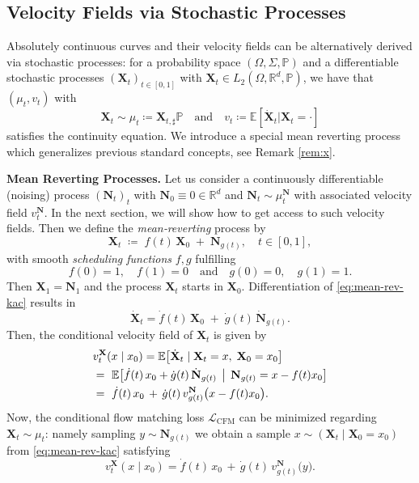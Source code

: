 \documentclass{article}
\newcommand{\R}{\mathbb{R}}
\theoremstyle{plain}
\theoremstyle{definition}
\theoremstyle{remark}
\begin{document}
{\subsection{Velocity Fields via Stochastic Processes}\label{sec:cooking}}
Absolutely continuous curves and their velocity fields can be alternatively derived via stochastic processes:
for a probability space $(\Omega, \Sigma, \mathbb P)$ and a differentiable stochastic processes $(\mathbf X_t)_{t \in [0,1]}$ with $\mathbf X_t \in L_2(\Omega,\mathbb R^d, \mathbb P)$, we have that $(\mu_t,v_t)$ with
\begin{equation}\label{eq:Ce_process}
\mathbf X_t \sim \mu_t \coloneqq \mathbf X_{t,\sharp} \mathbb P 
\quad \text{and} \quad v_t \coloneqq \mathbb E [ \mathbf{\dot X}_t| \mathbf X_t = \cdot]
\end{equation}
satisfies the continuity equation.
We introduce a special mean reverting process which generalizes previous standard concepts, see Remark \ref{rem:x}.

\textbf{Mean Reverting Processes.} 
Let us consider a continuously differentiable (noising) process $(\mathbf{N}_t)_t$ with $\mathbf{N}_0 \equiv 0 \in \R^d$ and $\mathbf{N}_t \sim \mu^{\mathbf{N}}_t$
with associated velocity field $v^{\mathbf{N}}_t$.
In the next section, we will show how to get access to such velocity fields.
Then we define the \emph{mean‐reverting} process by
\begin{equation}\label{eq:mean-rev-kac}
  \mathbf{X}_t \;\coloneqq\; f(t)\,\mathbf{X}_0 \;+\; \mathbf{N}_{g(t)},
  \quad t\in[0,1],
\end{equation}
with smooth \emph{scheduling functions} \(f,g\) fulfilling
\begin{equation}\label{schedules}
  f(0)=1,\quad f(1)=0 \quad \text{and} \quad g(0)=0,\quad g(1) = 1.  
\end{equation}
Then \(\mathbf{X}_1=\mathbf{N}_{1}\) and  the process $\mathbf{X}_t$ starts in \(\mathbf{X}_0\).  Differentiation of \eqref{eq:mean-rev-kac} results in
\[
  \dot {\mathbf{X}}_t = \dot f(t)\,\mathbf{X}_0 \;+\; \dot g(t)\,\dot {\mathbf{N}}_{g(t)}.
\]
Then, the conditional velocity field of $\mathbf{X}_t$ is given by  
\begin{align}\label{eq:velo-OU}
  &v^{\mathbf{X}}_t(x \mid x_0)
  = \mathbb{E}\bigl[\dot {\mathbf{X}}_t \mid \mathbf{X}_t=x,\;\mathbf{X}_0=x_0\bigr]\nonumber\\
  &=~ \mathbb{E}\bigl[\dot f(t)\, x_0 + \dot g(t)\,\dot {\mathbf{N}}_{g(t)}
    \,\bigm|\,\mathbf{N}_{g(t)}=x-f(t)x_0\bigr]\nonumber\\
  &=~ \dot f(t)\,x_0 \,+\, \dot g(t)\,v^{\mathbf{N}}_{g(t)}\bigl(x - f(t)x_0 \bigr).
\end{align}
Now, the conditional flow matching loss 
$\mathcal{L}_{\text{CFM}}$ can be minimized  regarding $\mathbf{X}_t \sim \mu_t$: namely sampling $y \sim \mathbf{N}_{g(t)}$
we obtain a sample $x \sim (\mathbf{X}_t \mid \mathbf{X}_0 = x_0)$ from \eqref{eq:mean-rev-kac} satisfying 
$$v^{\mathbf{X}}_t(x\mid x_0) = \dot f(t)\,x_0 \,+\, \dot g(t)\,v^{\mathbf{N}}_{g(t)}\bigl(y \bigr).$$
\end{document}
